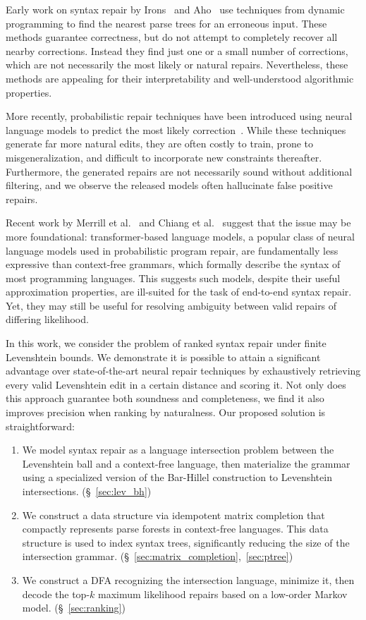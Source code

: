 \documentclass[sigplan,review,acmsmall,nonacm,anonymous]{acmart}\settopmatter{printfolios=false,printccs=false,printacmref=false}
\begin{document}
  Early work on syntax repair by Irons~\cite{irons1963error} and Aho~\cite{aho1972minimum} use techniques from dynamic programming to find the nearest parse trees for an erroneous input. These methods guarantee correctness, but do not attempt to completely recover all nearby corrections. Instead they find just one or a small number of corrections, which are not necessarily the most likely or natural repairs. Nevertheless, these methods are appealing for their interpretability and well-understood algorithmic properties.

  More recently, probabilistic repair techniques have been introduced using neural language models to predict the most likely correction~\cite{allamanis2021self, yasunaga2021break, sakkas2022seq2parse}. While these techniques generate far more natural edits, they are often costly to train, prone to misgeneralization, and difficult to incorporate new constraints thereafter. Furthermore, the generated repairs are not necessarily sound without additional filtering, and we observe the released models often hallucinate false positive repairs.

  Recent work by Merrill et al.~\cite{merrill2022saturated} and Chiang et al.~\cite{chiang2023tighter} suggest that the issue may be more foundational: transformer-based language models, a popular class of neural language models used in probabilistic program repair, are fundamentally less expressive than context-free grammars, which formally describe the syntax of most programming languages. This suggests such models, despite their useful approximation properties, are ill-suited for the task of end-to-end syntax repair. Yet, they may still be useful for resolving ambiguity between valid repairs of differing likelihood.

  In this work, we consider the problem of ranked syntax repair under finite Levenshtein bounds. We demonstrate it is possible to attain a significant advantage over state-of-the-art neural repair techniques by exhaustively retrieving every valid Levenshtein edit in a certain distance and scoring it. Not only does this approach guarantee both soundness and completeness, we find it also improves precision when ranking by naturalness. Our proposed solution is straightforward:

  \begin{enumerate}
    \item We model syntax repair as a language intersection problem between the Levenshtein ball and a context-free language, then materialize the grammar using a specialized version of the Bar-Hillel construction to Levenshtein intersections. (\S~\ref{sec:lev_bh})
    \item We construct a data structure via idempotent matrix completion that compactly represents parse forests in context-free languages. This data structure is used to index syntax trees, significantly reducing the size of the intersection grammar. (\S~\ref{sec:matrix_completion},~\ref{sec:ptree})
    \item We construct a DFA recognizing the intersection language, minimize it, then decode the top-$k$ maximum likelihood repairs based on a low-order Markov model. (\S~\ref{sec:ranking})
  \end{enumerate}
\end{document}
